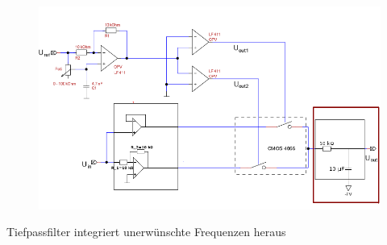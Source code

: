 \begin{frame}
    \frametitle{}
    \framesubtitle{}
    \begin{figure}[H]
    \begin{center}
            \includegraphics[scale=0.4]{./img/schaltung/gesamt_filter.png}
    \end{center}
    \end{figure}
    \begin{block}{}
        Tiefpassfilter integriert unerwünschte Frequenzen heraus
    \end{block}
\end{frame}
